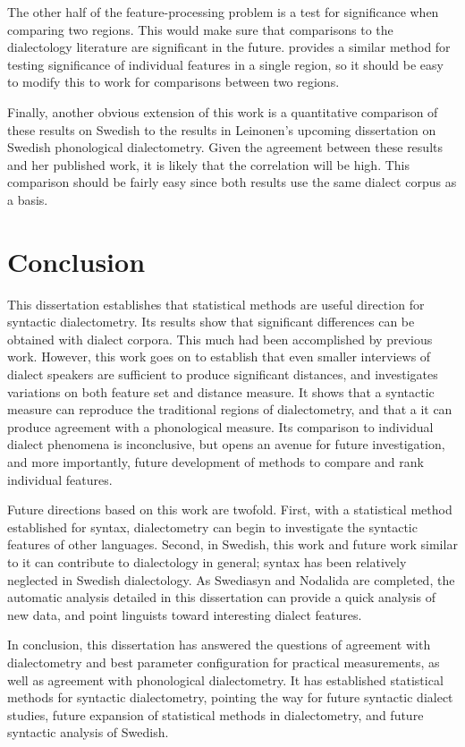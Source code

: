 The other half of the feature-processing problem is a test for
significance when comparing two regions. This would make sure that
comparisons to the dialectology literature are significant in the
future.  provides a similar method for testing
significance of individual features in a single region, so it should
be easy to modify this to work for comparisons between two regions.

Finally, another obvious extension of this work is a quantitative
comparison of these results on Swedish to the results in Leinonen's
upcoming dissertation on Swedish phonological dialectometry. Given the
agreement between these results and her published work, it is likely
that the correlation will be high. This comparison should be fairly
easy since both results use the same dialect corpus as a basis.

\section{Conclusion}

This dissertation establishes that statistical methods are useful
direction for syntactic dialectometry. Its results show that
significant differences can be obtained with dialect corpora. This
much had been accomplished by previous work. However, this work goes
on to establish that even smaller interviews of dialect speakers are
sufficient to produce significant distances, and investigates
variations on both feature set and distance measure. It shows that a
syntactic measure can reproduce the traditional regions of
dialectometry, and that a it can produce agreement with a phonological
measure. Its comparison to individual dialect phenomena is
inconclusive, but opens an avenue for future investigation, and more
importantly, future development of methods to compare and rank
individual features.

Future directions based on this work are twofold. First, with a
statistical method established for syntax, dialectometry can begin to
investigate the syntactic features of other languages. Second, in
Swedish, this work and future work similar to it can contribute to
dialectology in general; syntax has been relatively neglected in
Swedish dialectology. As Swediasyn and Nodalida are completed, the
automatic analysis detailed in this dissertation can provide a quick
analysis of new data, and point linguists toward interesting dialect
features.

In conclusion, this dissertation has answered the questions of
agreement with dialectometry and best parameter configuration for
practical measurements, as well as agreement with phonological
dialectometry. It has established statistical methods for syntactic
dialectometry, pointing the way for future syntactic dialect studies,
future expansion of statistical methods in dialectometry, and future
syntactic analysis of Swedish.

